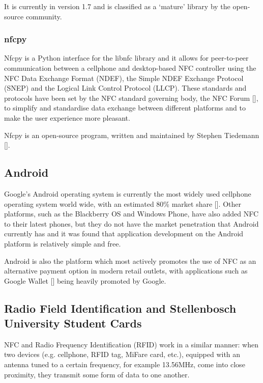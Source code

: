 It is currently in version 1.7 and is classified as a `mature' library by the
open-source community.

\subsubsection{nfcpy}
\label{sec:nfcpy}

Nfcpy is a Python interface for the libnfc library and it allows for peer-to-peer communication
between a cellphone and desktop-based NFC controller using the NFC Data Exchange Format
(NDEF), the Simple NDEF Exchange Protocol (SNEP) and the Logical Link Control Protocol (LLCP).
These standards and protocols have been set by the NFC standard governing body, the NFC Forum
[\cite{website:nfc-forum}], to simplify and standardise data exchange between different
platforms and to make the user experience more pleasant.

Nfcpy is an open-source program, written and maintained by Stephen Tiedemann
[\cite{website:nfcpy}].

\subsection{Android}

Google's Android operating system is currently the most widely used cellphone operating
system world wide, with an estimated 80\% market share
[\cite{article:android-marketshare}].
Other platforms, such as the Blackberry OS and Windows Phone, have also added NFC to their
latest phones, but they do not have the market penetration that Android currently has and it
was found that application development on the Android platform is relatively simple and free.

Android is also the platform which most actively promotes the use of NFC as an
alternative payment option in modern retail outlets, with applications such as Google Wallet
[\cite{article:android-wallet}] being heavily promoted by Google.

\subsection{Radio Field Identification and Stellenbosch
University Student Cards}

NFC and Radio Frequency Identification (RFID) work in a similar manner: when two
devices  (e.g. cellphone, RFID tag, MiFare card, etc.), equipped with an antenna
tuned to a certain frequency, for example 13.56MHz, come into close
proximity, they transmit some form of data to one another.

